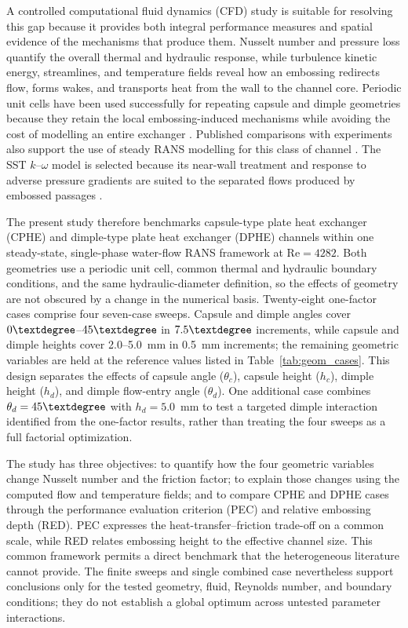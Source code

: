 \documentclass[energies,article,submit,moreauthors,noheaderline]{Definitions/mdpi}
\newcommand{\degree}{\texorpdfstring{\ensuremath{^\circ}}{\textdegree}}
\def\ensuremath#1{}%
\def\degree{\textdegree}%
\begin{document}
A controlled computational fluid dynamics (CFD) study is suitable for resolving this gap because it provides both integral performance measures and spatial evidence of the mechanisms that produce them. Nusselt number and pressure loss quantify the overall thermal and hydraulic response, while turbulence kinetic energy, streamlines, and temperature fields reveal how an embossing redirects flow, forms wakes, and transports heat from the wall to the channel core. Periodic unit cells have been used successfully for repeating capsule and dimple geometries because they retain the local embossing-induced mechanisms while avoiding the cost of modelling an entire exchanger \citep{hamedi2024, jiang2019a, jiang2020, piper2019, shao2024}. Published comparisons with experiments also support the use of steady RANS modelling for this class of channel \citep{mocnik2020, mocnik2023, mocnik2024}. The SST $k$--$\omega$ model is selected because its near-wall treatment and response to adverse pressure gradients are suited to the separated flows produced by embossed passages \citep{kanaris2006, menter1994}.

The present study therefore benchmarks capsule-type plate heat exchanger (CPHE) and dimple-type plate heat exchanger (DPHE) channels within one steady-state, single-phase water-flow RANS framework at $\mathrm{Re}=4282$. Both geometries use a periodic unit cell, common thermal and hydraulic boundary conditions, and the same hydraulic-diameter definition, so the effects of geometry are not obscured by a change in the numerical basis. Twenty-eight one-factor cases comprise four seven-case sweeps. Capsule and dimple angles cover $0\degree$--$45\degree$ in $7.5\degree$ increments, while capsule and dimple heights cover 2.0--5.0~mm in 0.5~mm increments; the remaining geometric variables are held at the reference values listed in Table~\ref{tab:geom_cases}. This design separates the effects of capsule angle ($\theta_c$), capsule height ($h_c$), dimple height ($h_d$), and dimple flow-entry angle ($\theta_d$). One additional case combines $\theta_d=45\degree$ with $h_d=5.0$~mm to test a targeted dimple interaction identified from the one-factor results, rather than treating the four sweeps as a full factorial optimization.

The study has three objectives: to quantify how the four geometric variables change Nusselt number and the friction factor; to explain those changes using the computed flow and temperature fields; and to compare CPHE and DPHE cases through the performance evaluation criterion (PEC) and relative embossing depth (RED). PEC expresses the heat-transfer--friction trade-off on a common scale, while RED relates embossing height to the effective channel size. This common framework permits a direct benchmark that the heterogeneous literature cannot provide. The finite sweeps and single combined case nevertheless support conclusions only for the tested geometry, fluid, Reynolds number, and boundary conditions; they do not establish a global optimum across untested parameter interactions.
\end{document}
